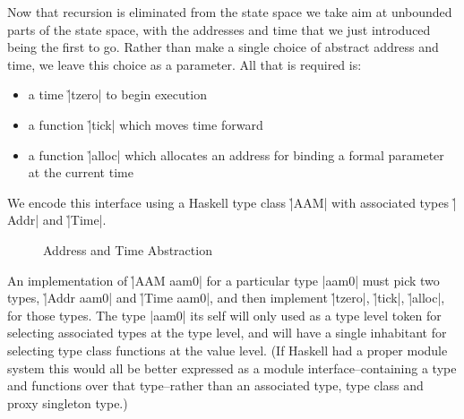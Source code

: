 Now that recursion is eliminated from the state space we take aim at unbounded
parts of the state space, with the addresses and time that we just introduced
being the first to go.
%
Rather than make a single choice of abstract address and time, we leave this
choice as a parameter.
%
All that is required is:
\begin{itemize}
\item a time \h|tzero| to begin execution
\item a function \h|tick| which moves time forward
\item a function \h|alloc| which allocates an address for binding a formal
      parameter at the current time
\end{itemize}
%
We encode this interface using a Haskell type class \h|AAM| with associated
types \h|Addr| and \h|Time|.
%
\begin{figure}[H]
\caption*{Address and Time Abstraction}
\end{figure}
\noindent
%
An implementation of \h|AAM aam0| for a particular type \p|aam0| must pick two
types, \h|Addr aam0| and \h|Time aam0|, and then implement \h|tzero|, \h|tick|,
\h|alloc|, for those types.
%
The type |aam0| its self will only used as a type level token for selecting
associated types at the type level, and will have a single inhabitant for
selecting type class functions at the value level.
%
(If Haskell had a proper module system this would all be better expressed as a
module interface--containing a type and functions over that type--rather than
an associated type, type class and proxy singleton type.)
